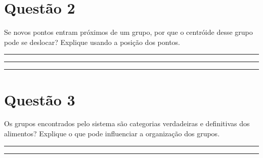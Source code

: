 \documentclass[12pt,a4paper]{article}
\newcommand{\linha}{\rule{\linewidth}{0.35pt}}
\begin{document}
\section*{Questão 2}

Se novos pontos entram próximos de um grupo, por que o centróide desse grupo pode se deslocar? Explique usando a posição dos pontos.

\vspace{0.25em}
\linha\par\vspace{0.75em}
\linha\par\vspace{0.75em}
\linha

\section*{Questão 3}

Os grupos encontrados pelo sistema são categorias verdadeiras e definitivas dos alimentos? Explique o que pode influenciar a organização dos grupos.

\vspace{0.25em}
\linha\par\vspace{0.75em}
\linha
\end{document}
